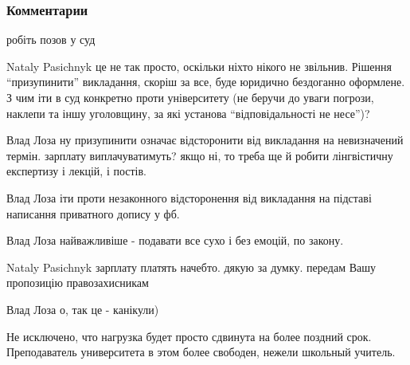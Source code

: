  
 
 
 
 
\subsubsection{Комментарии}
\label{sec:03_02_2021.fb.loza_vladislav.1.pismo_v_zaschity_bilchenko_vchena_rada.cmt}

\begin{itemize}

робіть позов у суд


Nataly Pasichnyk це не так просто, оскільки ніхто нікого не звільнив. Рішення
\enquote{призупинити} викладання, скоріш за все, буде юридично бездоганно оформлене. З
чим іти в суд конкретно проти університету (не беручи до уваги погрози, наклепи
та іншу уголовщину, за які установа \enquote{відповідальності не несе})?


Влад Лоза ну призупинити означає відсторонити від викладання на невизначений
термін. зарплату виплачуватимуть? якщо ні, то треба ще й робити лінгвістичну
експертизу і лекцій, і постів.


Влад Лоза іти проти незаконного відсторонення від викладання на підставі
написання приватного допису у фб.


Влад Лоза найважливіше - подавати все сухо і без емоцій, по закону.


Nataly Pasichnyk зарплату платять начебто. дякую за думку. передам Вашу пропозицію правозахисникам

Влад Лоза о, так це - канікули)


Не исключено, что нагрузка будет просто сдвинута на более поздний срок.
Преподаватель университета в этом более свободен, нежели школьный учитель.


\end{itemize}
